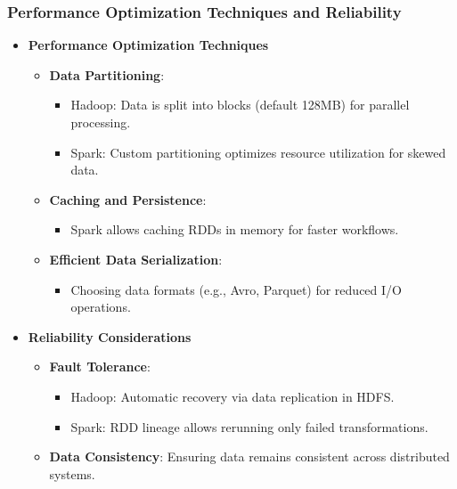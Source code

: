 \documentclass{beamer}
\begin{document}
\begin{frame}[fragile]
    \frametitle{Performance Optimization Techniques and Reliability}
    \begin{itemize}
        \item \textbf{Performance Optimization Techniques}
            \begin{itemize}
                \item \textbf{Data Partitioning}:
                    \begin{itemize}
                        \item Hadoop: Data is split into blocks (default 128MB) for parallel processing.
                        \item Spark: Custom partitioning optimizes resource utilization for skewed data.
                    \end{itemize}
                \item \textbf{Caching and Persistence}:
                    \begin{itemize}
                        \item Spark allows caching RDDs in memory for faster workflows.
                    \end{itemize}
                \item \textbf{Efficient Data Serialization}:
                    \begin{itemize}
                        \item Choosing data formats (e.g., Avro, Parquet) for reduced I/O operations.
                    \end{itemize}
            \end{itemize}

        \item \textbf{Reliability Considerations}
            \begin{itemize}
                \item \textbf{Fault Tolerance}:
                    \begin{itemize}
                        \item Hadoop: Automatic recovery via data replication in HDFS.
                        \item Spark: RDD lineage allows rerunning only failed transformations.
                    \end{itemize}
                \item \textbf{Data Consistency}: Ensuring data remains consistent across distributed systems.
            \end{itemize}
    \end{itemize}
\end{frame}
\end{document}
